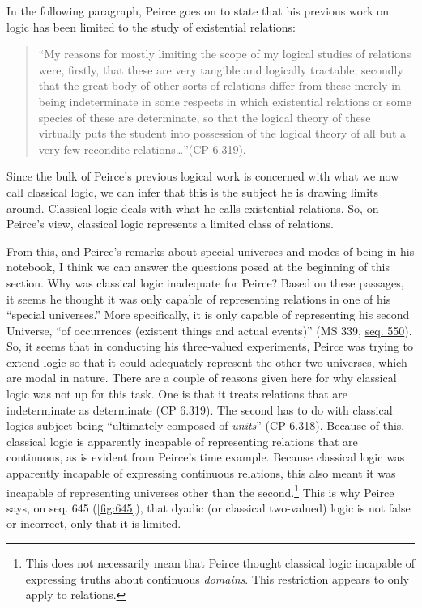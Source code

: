 In the following paragraph, Peirce goes on to state that his previous work on logic has been limited to the study of existential relations: \begin{quotation}\noindent``My reasons for mostly limiting the scope of my logical studies of relations were, firstly, that these are very tangible and logically tractable; secondly that the great body of other sorts of relations differ from these merely in being indeterminate in some respects in which existential relations or some species of these are determinate, so that the logical theory of these virtually puts the student into possession of the logical theory of all but a very few recondite relations\dots ''(CP 6.319).\end{quotation} Since the bulk of Peirce's previous logical work is concerned with what we now call classical logic, we can infer that this is the subject he is drawing limits around. Classical logic deals with what he calls existential relations. So, on Peirce's view, classical logic represents a limited class of relations. 

From this, and Peirce's remarks about special universes and modes of being in his notebook, I think we can answer the questions posed at the beginning of this section. Why was classical logic inadequate for Peirce? Based on these passages, it seems he thought it was only capable of representing relations in one of his ``special universes.'' More specifically, it is only capable of representing his second Universe, ``of occurrences (existent things and actual events)'' (MS 339, \href{https://iiif.lib.harvard.edu/manifests/view/drs:15255301$550i}{seq. 550}). So, it seems that in conducting his three-valued experiments, Peirce was trying to extend logic so that it could adequately represent the other two universes, which are modal in nature. There are a couple of reasons given here for why classical logic was not up for this task. One is that it treats relations that are indeterminate as determinate (CP 6.319). The second has to do with classical logics subject being ``ultimately composed of \textit{units}” (CP 6.318). Because of this, classical logic is apparently incapable of representing relations that are continuous, as is evident from Peirce's time example. Because classical logic was apparently incapable of expressing continuous relations, this also meant it was incapable of representing universes other than the second.\footnote{This does not necessarily mean that Peirce thought classical logic incapable of expressing truths about continuous \textit{domains}. This restriction appears to only apply to relations.} This is why Peirce says, on seq. 645 (\ref{fig:645}), that dyadic (or classical two-valued) logic is not false or incorrect, only that it is limited.

